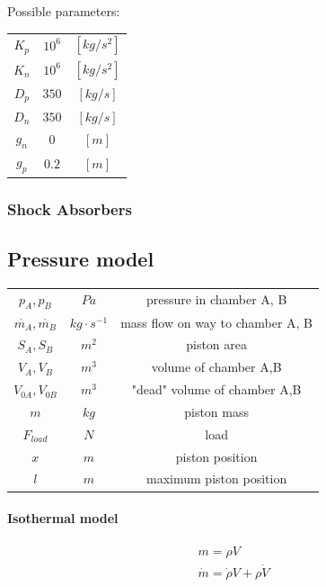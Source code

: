 \documentclass[class=article, crop=false]{standalone}
\begin{document}
Possible parameters: \\
\begin{tabular}{ |c|c|c| }
    \hline
    $K_p$ & $10^6$ & $[kg/s^2]$  \\
    $K_n$ & $10^6$ & $[kg/s^2]$  \\
    $D_p$ & $350$  & $[kg/s]$    \\
    $D_n$ & $350$  & $[kg/s]$    \\
    $g_n$ & $0  $  & $[m]$       \\
    $g_p$ & $0.2$  & $[m]$       \\
    \hline
\end{tabular}

\subsubsection{Shock Absorbers}

\subsection{Pressure model}

\begin{tabular}{ |c|c|c| }
    \hline
    $p_A, p_B$              & $Pa$              & pressure in chamber A, B \\
    $\dot{m_A}, \dot{m_B}$  & $kg \cdot s^{-1}$ & mass flow on way to chamber A, B \\
    $S_A, S_B$              & $m^2$             & piston area  \\
    $V_A, V_B$              & $m^3$             & volume of chamber A,B \\
    $V_{0A}, V_{0B}$        & $m^3$             & "dead" volume of chamber A,B \\
    $m$                     & $kg$              & piston mass\\
    $F_{load}$              & $N$               & load \\
    $x$                     & $m$               & piston position \\
    $l$                     & $m$               & maximum piston position \\
    \hline
\end{tabular}



\paragraph{Isothermal model}
\begin{align}
    m = \rho V \\
    \dot{m} = \dot{\rho} V + \rho \dot{V}
\end{align}
\end{document}
